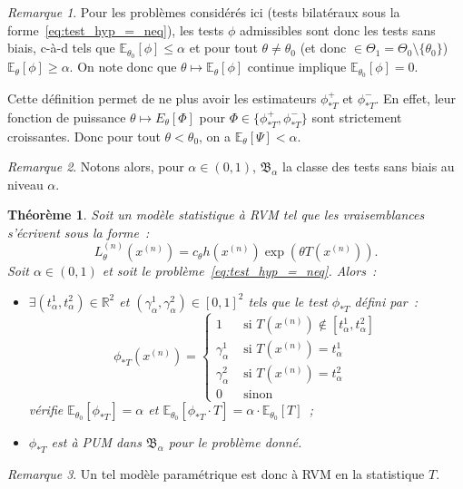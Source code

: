 \documentclass{report}
\newcommand{\E}{\mathbb E}
\newcommand{\R}{\mathbb R}
\newcommand{\n}{{(n)}}
\newtheorem{thm}{Théorème}[chapter]
\theoremstyle{definition}
\theoremstyle{remark}
\newtheorem*{rmq}{Remarque}
\begin{document}
			\begin{rmq} Pour les problèmes considérés ici (tests bilatéraux sous la forme~\eqref{eq:test_hyp_=_neq}), les tests $\phi$ admissibles sont donc les
			tests sans biais, c-à-d tels que $\E_{\theta_0}[\phi] \leq \alpha$ et pour tout $\theta \neq \theta_0$ (et donc
			$\in \Theta_1 = \Theta_0 \setminus \{\theta_0\}$) $\E_\theta[\phi] \geq \alpha$. On note donc que $\theta \mapsto \E_\theta[\phi]$ continue implique
			$\E_{\theta_0}[\phi] = 0$.

			Cette définition permet de ne plus avoir les estimateurs $\phi_{*T}^+$ et $\phi_{*T}^-$. En effet, leur fonction de puissance
			$\theta \mapsto E_\theta[\Phi]$ pour $\Phi \in \{\phi_{*T}^+, \phi_{*T}^-\}$ sont strictement croissantes. Donc pour tout $\theta < \theta_0$, on a
			$\E_\theta[\Psi] < \alpha$.
			\end{rmq}

			\begin{rmq} Notons alors, pour $\alpha \in (0, 1)$, $\mathfrak B_\alpha$ la classe des tests sans biais au niveau $\alpha$.
			\end{rmq}

			\begin{thm} Soit un modèle statistique à RVM tel que les vraisemblances s'écrivent sous la forme~:
			\[L_\theta^\n(x^\n) = c_\theta h(x^\n)\exp(\theta T(x^\n)).\]
			Soit $\alpha \in (0, 1)$ et soit le problème~\eqref{eq:test_hyp_=_neq}. Alors~:
			\begin{itemize}
				\item $\exists (t_\alpha^1, t_\alpha^2) \in \R^2$ et $(\gamma_\alpha^1, \gamma_\alpha^2) \in [0, 1]^2$ tels que le test $\phi_{*T}$ défini par~:
				\[\phi_{*T}(x^\n) =
				\begin{cases}
					1 &\text{ si } T(x^\n) \not \in [t_\alpha^1, t_\alpha^2] \\
					\gamma_\alpha^1 &\text{ si } T(x^\n) = t_\alpha^1 \\
					\gamma_\alpha^2 &\text{ si } T(x^\n) = t_\alpha^2 \\
					0 &\text{ sinon}
				\end{cases}\]
				vérifie $\E_{\theta_0}[\phi_{*T}] = \alpha$ et $\E_{\theta_0}[\phi_{*T} \cdot T] = \alpha \cdot \E_{\theta_0}[T]$~;
				\item $\phi_{*T}$ est à PUM dans $\mathfrak B_\alpha$ pour le problème donné.
			\end{itemize}
			\end{thm}

			\begin{rmq} Un tel modèle paramétrique est donc à RVM en la statistique $T$.
			\end{rmq}
\end{document}
